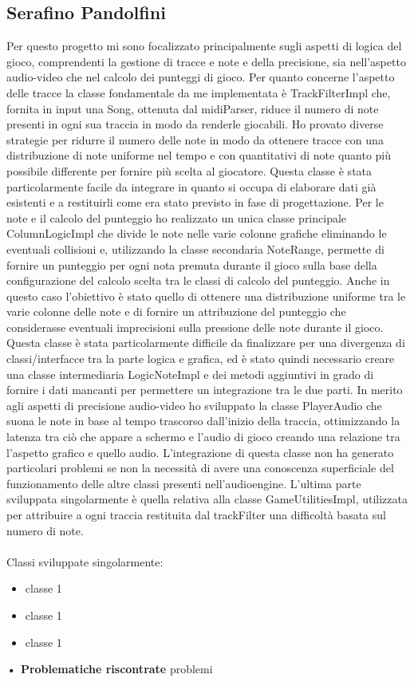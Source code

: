 \documentclass[a4paper,12pt]{report}
\begin{document}
\subsection{Serafino Pandolfini}
Per questo progetto mi sono focalizzato principalmente sugli aspetti di logica del gioco, comprendenti la gestione di tracce e note e della precisione, sia nell'aspetto audio-video che nel calcolo dei punteggi di gioco. Per quanto concerne l'aspetto delle tracce la classe fondamentale da me implementata è TrackFilterImpl che, fornita in input una Song, ottenuta dal midiParser, riduce il numero di note presenti in ogni sua traccia in modo da renderle giocabili. Ho provato diverse strategie per ridurre il numero delle note in modo da ottenere tracce con una distribuzione di note uniforme nel tempo e con quantitativi di note quanto più possibile differente per fornire più scelta al giocatore. Questa classe è stata particolarmente facile da integrare in quanto si occupa di elaborare dati già esistenti e a restituirli come era stato previsto in fase di progettazione. Per le note e il calcolo del punteggio ho realizzato un unica classe principale ColumnLogicImpl che divide le note nelle varie colonne grafiche eliminando le eventuali collisioni e, utilizzando la classe secondaria NoteRange, permette di fornire un punteggio per ogni nota premuta durante il gioco sulla base della configurazione del calcolo scelta tra le classi di calcolo del punteggio. Anche in questo caso l'obiettivo è stato quello di ottenere una distribuzione uniforme tra le varie colonne delle note e di fornire un attribuzione del punteggio che considerasse eventuali imprecisioni sulla pressione delle note durante il gioco. Questa classe è stata particolarmente difficile da finalizzare per una divergenza di classi/interfacce tra la parte logica e grafica, ed è stato quindi necessario creare una classe intermediaria LogicNoteImpl e dei metodi aggiuntivi in grado di fornire i dati mancanti per permettere un integrazione tra le due parti.  
In merito agli aspetti di precisione audio-video ho sviluppato la classe PlayerAudio che suona le note in base al tempo trascorso dall'inizio della traccia, ottimizzando la latenza tra ciò che appare a schermo e l'audio di gioco creando una relazione tra l'aspetto grafico e quello audio.
L'integrazione di questa classe non ha generato particolari problemi se non la necessità di avere una conoscenza superficiale del funzionamento delle altre classi presenti nell'audioengine.
L'ultima parte sviluppata singolarmente è quella relativa alla classe GameUtilitiesImpl, utilizzata per attribuire a ogni traccia restituita dal trackFilter una difficoltà basata sul numero di note.
 \\ \\
Classi sviluppate singolarmente:
{
	\begin{itemize}
		\item classe 1
		\item classe 1
		\item classe 1
	\end{itemize}
}
\hfill\break
\textbf{• Problematiche riscontrate}\hfill\break
problemi 
\newpage
\end{document}
